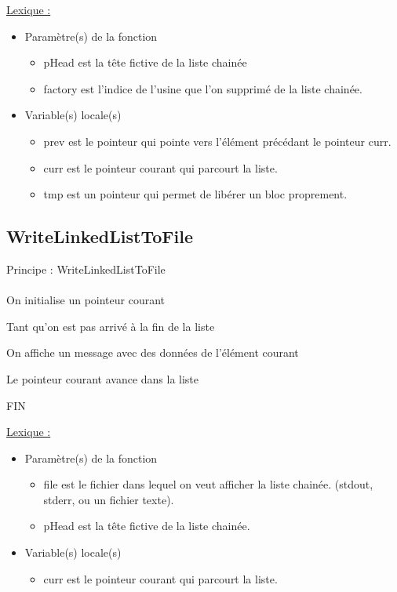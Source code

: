 \documentclass[a4paper]{article}
\newcommand\tab[1][1cm]{\hspace*{#1}}
\begin{document}
\underline{Lexique :}
\begin{itemize}
\item Paramètre(s) de la fonction  
\begin{itemize}
\item pHead est la tête fictive de la liste chainée
\item factory est l'indice de l'usine que l'on supprimé de la liste chainée.
\end{itemize}
\item Variable(s) locale(s)
\begin{itemize}
\item prev est le pointeur qui pointe vers l'élément précédant le pointeur curr.
\item curr est le pointeur courant qui parcourt la liste.
\item tmp est un pointeur qui permet de libérer un bloc proprement.
\end{itemize}
\end{itemize}

\subsection{WriteLinkedListToFile}
\begin{algorithm}
Principe : WriteLinkedListToFile
\\
\\
\tab On initialise un pointeur courant

\tab Tant qu'on est pas arrivé à la fin de la liste 

\tab \tab On affiche un message avec des données de l'élément courant

\tab \tab Le pointeur courant avance dans la liste 

FIN
\end{algorithm}

\underline{Lexique :}
\begin{itemize}
\item Paramètre(s) de la fonction  
\begin{itemize}
\item file est le fichier dans lequel on veut afficher la liste chainée. (stdout, stderr, ou un fichier texte).
\item pHead est la tête fictive de la liste chainée.
\end{itemize}
\item Variable(s) locale(s)
\begin{itemize}
\item curr est le pointeur courant qui parcourt la liste.
\end{itemize}
\end{itemize}
\end{document}
